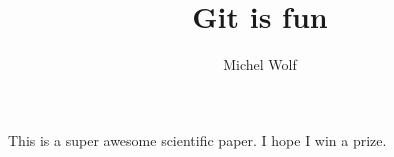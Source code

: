\documentclass[10pt]{article}
\author{Michel Wolf}
\title{Git is fun}
\begin{document}
	\maketitle

	This is a super awesome scientific paper.
	I hope I win a prize.
\end{document}
